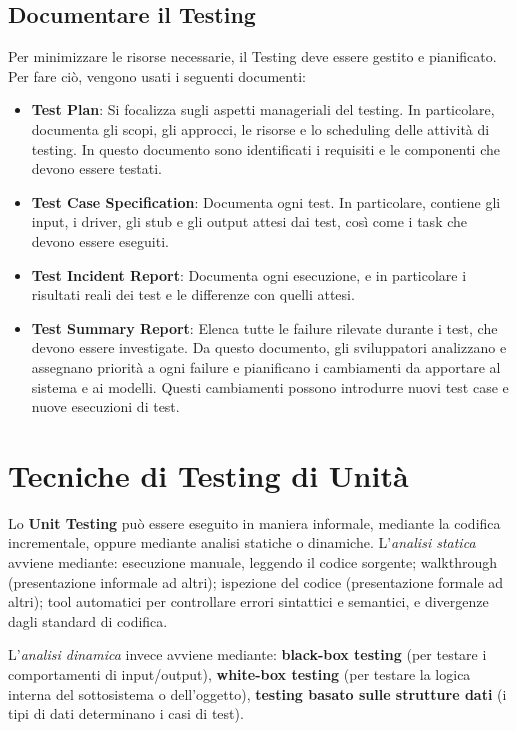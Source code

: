         \subsection{Documentare il Testing}
            Per minimizzare le risorse necessarie, il Testing deve essere gestito e pianificato. Per fare ciò, vengono usati i seguenti documenti:
            \begin{itemize}
                \item \textbf{Test Plan}: Si focalizza sugli aspetti manageriali del testing. In particolare, documenta gli scopi, gli approcci, le risorse e lo scheduling delle attività di testing. In questo documento sono identificati i requisiti e le componenti che devono essere testati.
                \item \textbf{Test Case Specification}: Documenta ogni test. In particolare, contiene gli input, i driver, gli stub e gli output attesi dai test, così come i task che devono essere eseguiti.
                \item \textbf{Test Incident Report}: Documenta ogni esecuzione, e in particolare i risultati reali dei test e le differenze con quelli attesi.
                \item \textbf{Test Summary Report}: Elenca tutte le failure rilevate durante i test, che devono essere investigate. Da questo documento, gli sviluppatori analizzano e assegnano priorità a ogni failure e pianificano i cambiamenti da apportare al sistema e ai modelli. Questi cambiamenti possono introdurre nuovi test case e nuove esecuzioni di test.
            \end{itemize}
            
            
    \section{Tecniche di Testing di Unità}
        Lo \textbf{Unit Testing} può essere eseguito in maniera informale, mediante la codifica incrementale, oppure mediante analisi statiche o dinamiche. L'\textit{analisi statica} avviene mediante: esecuzione manuale, leggendo il codice sorgente; walkthrough (presentazione informale ad altri); ispezione del codice (presentazione formale ad altri); tool automatici per controllare errori sintattici e semantici, e divergenze dagli standard di codifica.
        
        L'\textit{analisi dinamica} invece avviene mediante: \textbf{black-box testing} (per testare i comportamenti di input/output), \textbf{white-box testing} (per testare la logica interna del sottosistema o dell'oggetto), \textbf{testing basato sulle strutture dati} (i tipi di dati determinano i casi di test).
        

